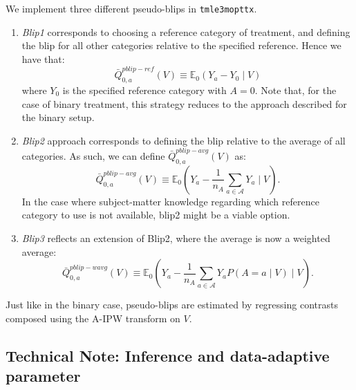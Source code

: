 \documentclass[
  12pt, krantz2,
]{krantz}
\newcommand{\passthrough}[1]{#1}
\theoremstyle{definition}
\theoremstyle{definition}
\theoremstyle{definition}
\newcommand{\E}{\mathbb{E}}
\newcommand{\1}{\mathbbm{1}}
\begin{document}
We implement three different pseudo-blips in \passthrough{\lstinline!tmle3mopttx!}.

\begin{enumerate}
\def\labelenumi{\arabic{enumi}.}
\item
  \emph{Blip1} corresponds to choosing a reference category of treatment, and
  defining the blip for all other categories relative to the specified
  reference. Hence we have that:
  \[\bar{Q}_{0,a}^{pblip-ref}(V) \equiv \E_0(Y_a-Y_0 \mid V)\] where \(Y_0\) is
  the specified reference category with \(A=0\). Note that, for the case of
  binary treatment, this strategy reduces to the approach described for the
  binary setup.
\item
  \emph{Blip2} approach corresponds to defining the blip relative to the average of
  all categories. As such, we can define \(\bar{Q}_{0,a}^{pblip-avg}(V)\) as:
  \[\bar{Q}_{0,a}^{pblip-avg}(V) \equiv \E_0(Y_a - \frac{1}{n_A} \sum_{a \in
    \mathcal{A}} Y_a \mid V).\]
  In the case where subject-matter knowledge regarding which reference category
  to use is not available, blip2 might be a viable option.
\item
  \emph{Blip3} reflects an extension of Blip2, where the average is now a weighted
  average:
  \[\bar{Q}_{0,a}^{pblip-wavg}(V) \equiv \E_0(Y_a - \frac{1}{n_A} \sum_{a \in
    \mathcal{A}} Y_{a} P(A=a \mid V) \mid V).\]
\end{enumerate}

Just like in the binary case, pseudo-blips are estimated by regressing contrasts
composed using the A-IPW transform on \(V\).

\hypertarget{technical-note-inference-and-data-adaptive-parameter}{%
\subsection{Technical Note: Inference and data-adaptive parameter}\label{technical-note-inference-and-data-adaptive-parameter}}
\end{document}

